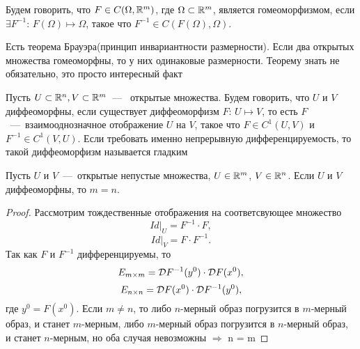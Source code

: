 \begin{definition}
\hypertarget{homeomorphism_definition}{}
Будем говорить, что $F \in C(\Omega, \mathbb{R}^m)$, где $\Omega \subset \mathbb{R}^m$, является гомеоморфизмом, если $\exists F^{-1}$: $F(\Omega) \mapsto \Omega$, такое что $F^{-1} \in C(F(\Omega), \Omega)$.
\end{definition}

\begin{note}
    Есть теорема Брауэра(принцип инвариантности размерности). Если два открытых множества гомеоморфны, то у них одинаковые размерности. Теорему знать не обязательно, это просто интересный факт
\end{note}

\begin{definition}
    Пусть $U \subset \mathbb{R}^n, V \subset \mathbb{R}^m$~---~ открытые множества. Будем говорить, что $U$ и $V$ диффеоморфны, если существует диффеоморфизм $F$: $U \mapsto V$, то есть $F$~---~взаимооднозначное отображение $U$ на $V$, такое что $F \in C^1(U, V)$ и  $F^{-1} \in C^1(V, U)$. Если требовать именно непрерывную дифференцируемость, то такой диффеоморфизм называется гладким
\end{definition}
\begin{note}
    Пусть $U$ и $V$~---~открытые непустые множества, $U \in \mathbb{R}^m$, $V \in \mathbb{R}^n$. Если $U$ и $V$ диффеоморфны, то $m = n$.
\end{note}
\begin{proof}
Рассмотрим тождественные отображения на соответсвующее множество
    $$Id|_U = F^{-1} \cdot F, $$ $$Id|_V = F \cdot F^{-1}.$$
Так как $F$ и $F^{-1}$ дифференцируемы, то
\[
E_{m \times m} = \mathcal{D} F^{-1}(y^0) \cdot \mathcal{D} F(x^0),
\]
\[
E_{n \times n} = \mathcal{D} F(x^0) \cdot \mathcal{D} F^{-1}(y^0),
\]
где $y^0 = F(x^0)$.
Если $m \neq n$, то либо $n$-мерный образ погрузится в $m$-мерный образ, и станет $m$-мерным, либо $m$-мерный образ погрузится в $n$-мерный образ, и станет $n$-мерным, но оба случая невозможны $\Rightarrow$ n = m
\end{proof}

